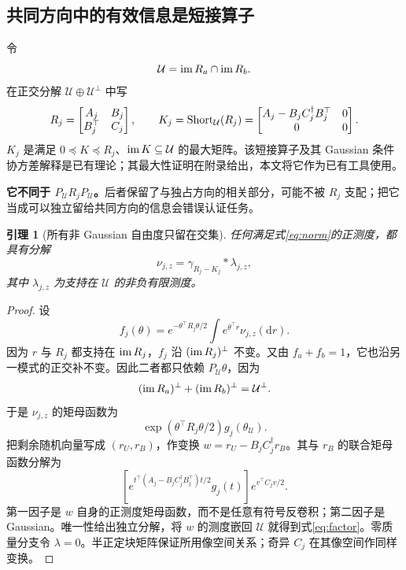 \documentclass[UTF8,fontset=fandol,zihao=5,a4paper]{ctexart}
\newcommand{\dd}{\mathrm d}\newcommand{\given}{\,|\,}
\newtheorem{lemma}[theorem]{引理}
\theoremstyle{definition}
\theoremstyle{remark}\newtheorem{remark}[theorem]{说明}
\numberwithin{equation}{section}
\begin{document}
\subsection{共同方向中的有效信息是短接算子}
令
\begin{equation}
\mathcal U=\operatorname{im} R_a\cap\operatorname{im} R_b.
\end{equation}
在正交分解 $\mathcal U\oplus\mathcal U^\perp$ 中写
\begin{equation}
R_j=\begin{bmatrix}A_j&B_j\\B_j^\top&C_j\end{bmatrix},\qquad
K_j=\operatorname{Short}_{\mathcal U}(R_j)
=\begin{bmatrix}A_j-B_jC_j^\dagger B_j^\top&0\\0&0\end{bmatrix}.
\label{eq:short}
\end{equation}
$K_j$ 是满足 $0\preceq K\preceq R_j$、$\operatorname{im} K\subseteq\mathcal U$ 的最大矩阵。该短接算子及其 Gaussian 条件协方差解释是已有理论\cite{anderson,owhadi}；其最大性证明在附录给出，本文将它作为已有工具使用。

\textbf{它不同于 $P_{\mathcal U}R_jP_{\mathcal U}$。}后者保留了与独占方向的相关部分，可能不被 $R_j$ 支配；把它当成可以独立留给共同方向的信息会错误认证任务。

\begin{lemma}[所有非 Gaussian 自由度只留在交集]
\label{lem:factor}
任何满足式\eqref{eq:norm}的正测度，都具有分解
\begin{equation}
\boxed{\nu_{j,z}=\gamma_{R_j-K_j}*\lambda_{j,z},}
\label{eq:factor}
\end{equation}
其中 $\lambda_{j,z}$ 为支持在 $\mathcal U$ 的非负有限测度。
\end{lemma}
\begin{proof}
设
\[
f_j(\theta)=e^{-\theta^\top R_j\theta/2}
\int e^{\theta^\top r}\nu_{j,z}(\dd r).
\]
因为 $r$ 与 $R_j$ 都支持在 $\operatorname{im} R_j$，$f_j$ 沿 $(\operatorname{im} R_j)^\perp$ 不变。又由 $f_a+f_b=1$，它也沿另一模式的正交补不变。因此二者都只依赖 $P_{\mathcal U}\theta$，因为
\[
(\operatorname{im} R_a)^\perp+(\operatorname{im} R_b)^\perp=\mathcal U^\perp.
\]
于是 $\nu_{j,z}$ 的矩母函数为
\[
\exp(\theta^\top R_j\theta/2)g_j(\theta_{\mathcal U}).
\]
把剩余随机向量写成 $(r_U,r_B)$，作变换
$w=r_U-B_jC_j^\dagger r_B$。其与 $r_B$ 的联合矩母函数分解为
\[
\left[e^{t^\top(A_j-B_jC_j^\dagger B_j^\top)t/2}g_j(t)\right]
 e^{v^\top C_jv/2}.
\]
第一因子是 $w$ 自身的正测度矩母函数，而不是任意有符号反卷积；第二因子是 Gaussian。唯一性给出独立分解，将 $w$ 的测度嵌回 $\mathcal U$ 就得到式\eqref{eq:factor}。零质量分支令 $\lambda=0$。半正定块矩阵保证所用像空间关系；奇异 $C_j$ 在其像空间作同样变换。
\end{proof}
\end{document}
